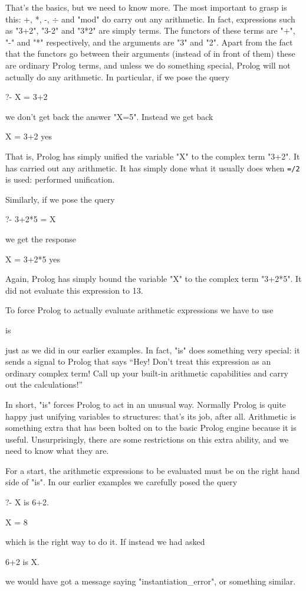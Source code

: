 That's the basics, but we need to know more.  The most important to
grasp is this: +, *, -, $\div$ and "mod" do  carry out
any arithmetic.  In fact, expressions such as "3+2", "3-2" and "3*2"
are simply terms.  The functors of these terms are "+", "-" and "*"
respectively, and the arguments are "3" and "2".  Apart from the fact
that the functors go between their arguments (instead of in front of
them) these are ordinary Prolog terms, and unless we do something
special, Prolog will not actually do any arithmetic.  In
particular, if we pose the query
\begin{LPNcodedisplay}
?- X = 3+2
\end{LPNcodedisplay}
we don't get back the answer "X=5".
Instead we get back
\begin{LPNcodedisplay}
X = 3+2
yes
\end{LPNcodedisplay}
That is, Prolog has simply unified the variable "X" to the complex
term "3+2".  It has  carried out any arithmetic.  It has
simply done what it usually does when \texttt{=/2} is used: performed
unification.

Similarly,
if we pose the query
\begin{LPNcodedisplay}
?- 3+2*5 = X
\end{LPNcodedisplay}
we get the response
\begin{LPNcodedisplay}
X = 3+2*5
yes
\end{LPNcodedisplay}
Again, Prolog has simply bound the variable "X" to the complex
term "3+2*5".  It did not evaluate this expression to 13.

To force Prolog to actually evaluate arithmetic expressions we have to
use
        \begin{LPNcodedisplay}
is
\end{LPNcodedisplay}
just as we did in our  earlier examples.  In fact, "is" does
something very special: it sends a signal to Prolog that says ``Hey!
Don't treat this expression as an ordinary complex term!  Call up
your built-in arithmetic capabilities and carry out the calculations!''

In short, "is" forces Prolog to act in an unusual way.  Normally
Prolog is quite happy just unifying variables to structures: that's
its job, after all.  Arithmetic is something extra that has been
bolted on to the basic Prolog engine because it is useful.
Unsurprisingly, there are some restrictions on this extra ability, and
we need to know what they are.

For a start, the arithmetic expressions to be evaluated must be on
the right hand side of "is".  In our earlier examples we carefully
posed the query
\begin{LPNcodedisplay}
?- X is 6+2.

X = 8
\end{LPNcodedisplay}
which is the right way to do it. If instead we
had asked
\begin{LPNcodedisplay}
6+2 is X.
\end{LPNcodedisplay}
we would have got a message saying "instantiation\_error",
or something similar.


